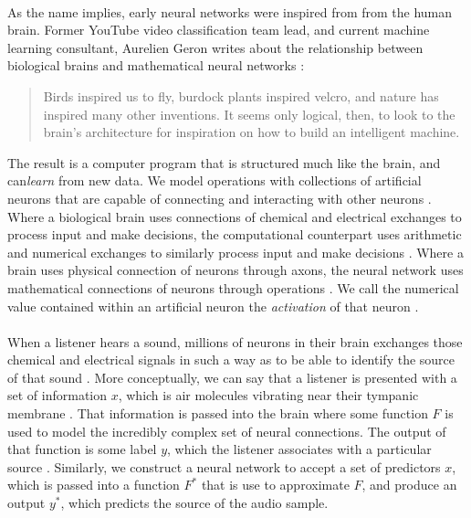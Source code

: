 \documentclass[12pt,letterpaper]{article}
\begin{document}
\paragraph*{}As the name implies, early neural networks were inspired from from the human brain. Former YouTube video classification team lead, and current machine learning consultant, Aurelien Geron writes about the relationship between biological brains and mathematical neural networks \cite{Geron}: 
\begin{quote}
Birds inspired us to fly, burdock plants inspired velcro, and nature has inspired many other inventions. It seems only logical, then, to look to the brain's architecture for inspiration on how to build an intelligent machine.
\end{quote}
The result is a computer program that is structured much like the brain, and can\textit{learn} from new data. We model operations with collections of artificial neurons that are capable of connecting and interacting with other neurons \cite{Levine}. Where a biological brain uses connections of chemical and electrical exchanges to process input and make decisions, the computational counterpart uses arithmetic and numerical exchanges to similarly process input and make decisions \cite{Levine,Bishop}. Where a brain uses physical connection of neurons through axons, the neural network uses mathematical connections of neurons through operations \cite{Geron,Levine}. We call the numerical value contained within an artificial neuron the \textit{activation} of that neuron \cite{Goodfellow,Geron}. 

\paragraph*{}When a listener hears a sound, millions of neurons in their brain exchanges those chemical and electrical signals in such a way as to be able to identify the source of that sound \cite{Geron,Virtanen}. More conceptually, we can say that a listener is presented with a set of information $x$, which is air molecules vibrating near their tympanic membrane \cite{White,Olson}. That information is passed into the brain where some function $F$ is used to model the incredibly complex set of neural connections. The output of that function is some label $y$, which the listener associates with a particular source \cite{Olson}. Similarly, we construct a neural network to accept a set of predictors $x$, which is passed into a function $F^*$ that is use to approximate $F$, and produce an output $y^*$, which predicts the source of the audio sample.
\end{document}
